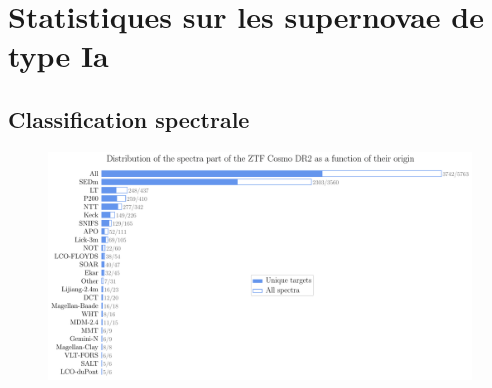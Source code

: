\documentclass[../main/main.tex]{subfiles}
\begin{document}
\begin{figure}[ht]
  \centering
  \caption[]{}
  \label{fig:skycoverage}
\end{figure}


\section{Statistiques sur les supernovae de type Ia}

\subsection{Classification spectrale}

\begin{figure}[ht]
  \centering
  \includegraphics[width=1\textwidth]{../figures/09_dr2/spec_instorigin_dr2.pdf}
  \caption[]{}
  \label{fig:specorigindr2}
\end{figure}
\end{document}
